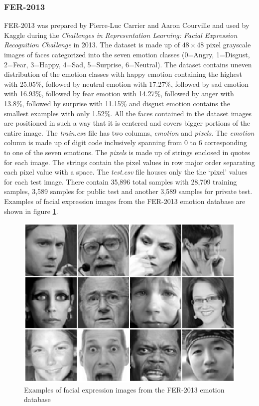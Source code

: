 \documentclass[master]{thesis-uestc}
\begin{document}
\subsubsection{FER-2013}
FER-2013 was prepared by Pierre-Luc Carrier and Aaron Courville and used by Kaggle during the \textit{Challenges in Representation Learning: Facial Expression Recognition Challenge} in 2013. The dataset is made up of $48\times48$ pixel grayscale images of faces categorized into the seven emotion classes (0=Angry, 1=Disgust, 2=Fear, 3=Happy, 4=Sad, 5=Surprise, 6=Neutral). The dataset contains uneven distribution of the emotion classes with happy emotion containing the highest with 25.05\%, followed by neutral emotion with 17.27\%, followed by sad emotion with 16.93\%, followed by fear emotion with 14.27\%, followed by anger with 13.8\%, followed by surprise with 11.15\% and disgust emotion contains the smallest examples with only 1.52\%.  All the faces contained in the dataset images are positioned in such a way that it is centered and covers bigger portions of the entire image. The \textit{train.csv} file has two columns, \textit{emotion} and \textit{pixels}. The \textit{emotion} column is made up of digit code inclusively spanning from 0 to 6 corresponding to one of the seven emotions. The \textit{pixels} is made up of strings enclosed in quotes for each image. The strings contain the pixel values in row major order separating each pixel value with a space. The \textit{test.csv} file houses only the the `pixel' values for each test image. There contain 35,896 total samples with 28,709 training samples, 3,589 samples for public test and another 3,589 samples for private test.  Examples of facial expression images from the FER-2013 emotion database are shown in figure \ref{fer2013_images}.
\begin{figure}[ht]
\includegraphics[width=5in]{pic/fer2013.png}
\caption{Examples of facial expression images from the FER-2013 emotion database}
\label{fer2013_images}
\end{figure}
\end{document}
